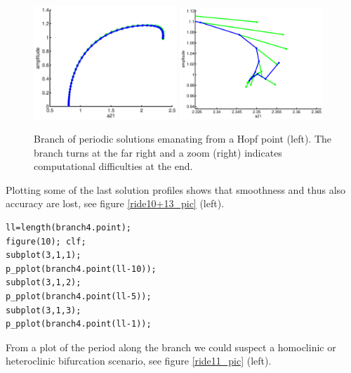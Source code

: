 \documentclass[10pt]{scrartcl}
\begin{document}
\begin{figure}[h]
\begin{center}
\includegraphics[width=0.48\textwidth]{fig/demo1fig09}
\includegraphics[width=0.48\textwidth]{fig/demo1figa09}
\end{center}
\caption{\label{ride9_pic}Branch of periodic solutions emanating
from a Hopf point (left). The branch turns at the far right and a zoom (right)
indicates computational difficulties at the end.} 
\end{figure}
Plotting some of the last solution profiles shows that smoothness
and thus also accuracy are lost, see figure \ref{ride10+13_pic} (left).
\begin{lstlisting}
ll=length(branch4.point);
figure(10); clf;
subplot(3,1,1);
p_pplot(branch4.point(ll-10));
subplot(3,1,2);
p_pplot(branch4.point(ll-5));
subplot(3,1,3);
p_pplot(branch4.point(ll-1));
\end{lstlisting}
From a plot of the period along the branch we could suspect a homoclinic
or heteroclinic bifurcation scenario, see figure \ref{ride11_pic} (left).
\end{document}

